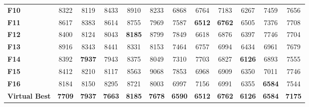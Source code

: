 \documentclass[runningheads]{llncs}
\begin{document}
\begin{table}[bt]
\begin{center}
\begin{tabular}{|l|c|c|c|c|c|c|c|c|c|c|c|}
      \textbf{F10}  & 8322  & 8119  & 8433 & 8910 & 8233 & 6868 & 6764 & 7183 & 6267 & 7459 & 7656 \\
      \textbf{F11} & 8617  & 8383  & 8614 & 8755 & 7969 & 7587 & \textbf{6512} & \textbf{6762}& 6505 & 7376 & 7708 \\
      \textbf{F12} & 8400  & 8124  & 8043 & \textbf{8185} & 8799 & 7849 & 6618 & 6876 & 6397 & 7746 & 7704 \\
      \textbf{F13} & 8916 & 8343  & 8441 & 8331 & 8153 & 7464 & 6757 & 6994 & 6434 & 6961 & 7679 \\
      \textbf{F14} & 8392  & \textbf{7937} & 7943 & 8375 & 8049 & 7310 & 7703 & 6827 & \textbf{6126} & 6893 & 7555 \\
      \textbf{F15} & 8412  & 8210  & 8117 & 8563 & 9068 & 7853 & 6968 & 6909 & 6350  & 7011 & 7746 \\
      \textbf{F16} & 8184 & 8150 & 8295 & 8721 & 8003 & 6997 & 7156 & 6991 & 6355 & \textbf{6584} & 7544 \\ 
      \textbf{Virtual Best} & \textbf{7709} & \textbf{7937} & \textbf{7663} & \textbf{8185} & \textbf{7678} & \textbf{6590} & \textbf{6512} & \textbf{6762} & \textbf{6126} & \textbf{6584} & \textbf{7175} \\
\hline
      \end{tabular}
  \end{center}
\end{table}
\end{document}
